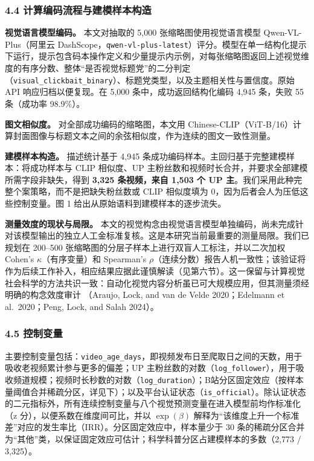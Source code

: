 \documentclass[
  fontset=none]{ctexart}
\begin{document}
\subsubsection{4.4 计算编码流程与建模样本构造}\label{ux6df7ux5408ux6807ux6ce8ux6d41ux7a0b}

\textbf{视觉语言模型编码。} 本文对抽取的 5{,}000 张缩略图使用视觉语言模型 Qwen-VL-Plus（阿里云 DashScope，\texttt{qwen-vl-plus-latest}）评分。模型在单一结构化提示下运行，提示包含码本操作定义和少量提示内示例，对每张缩略图返回上述视觉维度的有序分数、整体``是否视觉标题党''的二分判定（\texttt{visual\_clickbait\_binary}）、标题党类型，以及主题相关性与置信度。原始 API 响应归档以便复现。在 5{,}000 条中，成功返回结构化编码 4{,}945 条，失败 55 条（成功率 98.9\%）。

\textbf{图文相似度。} 对全部成功编码的缩略图，本文用 Chinese-CLIP（ViT-B/16）计算封面图像与标题文本之间的余弦相似度，作为连续的图文一致性测量。

\textbf{建模样本构造。} 描述统计基于 4{,}945 条成功编码样本。主回归基于完整建模样本：将成功样本与 CLIP 相似度、UP 主粉丝数和视频时长合并，并要求全部建模所需字段非缺失，得到 \textbf{3{,}325 条视频，来自 1{,}503 个 UP 主}。我们采用此种完整个案策略，而不是把缺失粉丝数或 CLIP 相似度填为 0，因为后者会人为压低这些控制变量。图 1 给出从原始语料到建模样本的逐步流失。

\textbf{测量效度的现状与局限。} 本文的视觉构念由视觉语言模型单独编码，尚未完成针对该模型输出的独立人工金标准复核。这是本研究当前最重要的测量局限。我们已规划在 200--500 张缩略图的分层子样本上进行双盲人工标注，并以二次加权 Cohen's \(\kappa\)（有序变量）和 Spearman's \(\rho\)（连续分数）报告人机一致性；该验证将作为后续工作补入，相应结果应据此谨慎解读（见第六节）。这一保留与计算视觉社会科学的方法共识一致：自动化视觉内容分析虽已可大规模应用，但其测量须经明确的构念效度审计 （Araujo, Lock, and van de Velde 2020；Edelmann et al.~2020；Peng, Lock, and Salah 2024）。

\subsubsection{4.5 控制变量}\label{ux63a7ux5236ux53d8ux91cf}

主要控制变量包括：\texttt{video\_age\_days}，即视频发布日至爬取日之间的天数，用于吸收老视频累计参与更多的偏差；UP 主粉丝数的对数（\texttt{log\_follower}），用于吸收频道规模；视频时长秒数的对数（\texttt{log\_duration}）；B站分区固定效应（按样本量阈值合并稀疏分区，详见下）；以及平台认证状态（\texttt{is\_official}）。除认证状态的二元指标外，所有连续控制变量与八个视觉预测变量在进入模型前均作标准化（z 分），以便系数在维度间可比，并以 \(\exp(\beta)\) 解释为``该维度上升一个标准差''对应的发生率比（IRR）。分区固定效应中，样本量少于 30 条的稀疏分区合并为``其他''类，以保证固定效应可估计；科学科普分区占建模样本的多数（2{,}773 / 3{,}325）。
\end{document}
